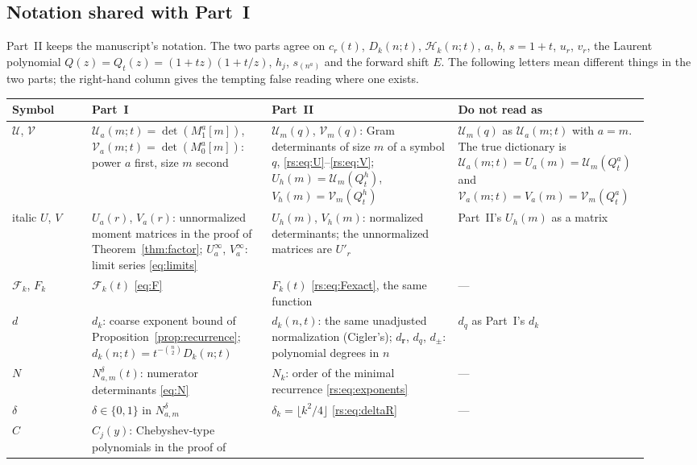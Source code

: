 \documentclass[11pt]{article}
\theoremstyle{definition}
\theoremstyle{remark}
\newcommand{\U}{\mathcal U}
\newcommand{\V}{\mathcal V}
\newcommand{\Ht}{\mathcal H}
\newcommand{\F}{\mathcal F}
\newcommand{\UU}{\mathcal U}
\newcommand{\VV}{\mathcal V}
\theoremstyle{definition}
\theoremstyle{plain}
\numberwithin{equation}{section}
\begin{document}
\subsection{Notation shared with Part~I}
\label{rs:sec:notation}
Part~II keeps the manuscript's notation. The two parts agree on $c_r(t)$,
$D_k(n;t)$, $\Ht_k(n;t)$, $a$, $b$, $s=1+t$, $u_r$, $v_r$, the Laurent
polynomial $Q(z)=Q_t(z)=(1+tz)(1+t/z)$, $h_j$, $s_{(n^a)}$ and the forward
shift $E$. The following letters mean different things in the two parts;
the right-hand column gives the tempting false reading where one exists.

{\small
\begin{longtable}{@{}>{\raggedright\arraybackslash}p{0.12\linewidth}>{\raggedright\arraybackslash}p{0.27\linewidth}>{\raggedright\arraybackslash}p{0.29\linewidth}>{\raggedright\arraybackslash}p{0.24\linewidth}@{}}
\toprule
Symbol & Part~I & Part~II & Do not read as\\
\midrule
\endhead
$\mathcal U$, $\mathcal V$ &
$\U_a(m;t)=\det(M_1^a[m])$, $\V_a(m;t)=\det(M_0^a[m])$: power $a$ first,
size $m$ second &
$\UU_m(q)$, $\VV_m(q)$: Gram determinants of size $m$ of a symbol $q$,
\eqref{rs:eq:U}--\eqref{rs:eq:V}; $U_h(m)=\UU_m(Q_t^h)$,
$V_h(m)=\VV_m(Q_t^h)$ &
$\UU_m(q)$ as $\U_a(m;t)$ with $a=m$. The true dictionary is
$\U_a(m;t)=U_a(m)=\UU_m(Q_t^a)$ and $\V_a(m;t)=V_a(m)=\VV_m(Q_t^a)$\\[3pt]
italic $U$, $V$ &
$U_a(r)$, $V_a(r)$: unnormalized moment matrices in the proof of
Theorem~\ref{thm:factor}; $U_a^\infty$, $V_a^\infty$: limit series
\eqref{eq:limits} &
$U_h(m)$, $V_h(m)$: normalized determinants; the unnormalized matrices are
$U'_r$ &
Part~II's $U_h(m)$ as a matrix\\[3pt]
$\F_k$, $F_k$ &
$\F_k(t)$ \eqref{eq:F} &
$F_k(t)$ \eqref{rs:eq:Fexact}, the same function &
---\\[3pt]
$d$ &
$d_k$: coarse exponent bound of Proposition~\ref{prop:recurrence};
$d_k(n;t)=t^{-\binom n2}D_k(n;t)$ &
$d_k(n,t)$: the same unadjusted normalization (Cigler's); $d_{\boldsymbol r}$,
$d_q$, $d_\pm$: polynomial degrees in $n$ &
$d_q$ as Part~I's $d_k$\\[3pt]
$N$ &
$N^\delta_{a,m}(t)$: numerator determinants \eqref{eq:N} &
$N_k$: order of the minimal recurrence \eqref{rs:eq:exponents} &
---\\[3pt]
$\delta$ &
$\delta\in\{0,1\}$ in $N^\delta_{a,m}$ &
$\delta_k=\lfloor k^2/4\rfloor$ \eqref{rs:eq:deltaR} &
---\\[3pt]
$C$ &
$C_j(y)$: Chebyshev-type polynomials in the proof of

\end{longtable}}
\end{document}
